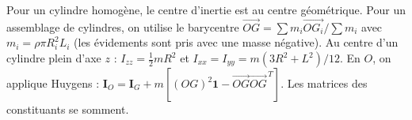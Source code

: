 \begin{corrigebox}
Pour un cylindre homogène, le centre d'inertie est au centre
                géométrique. Pour un assemblage de cylindres, on utilise le barycentre
                $\overrightarrow{OG}=\sum m_i\overrightarrow{OG_i}/\sum m_i$ avec
                $m_i=\rho\pi R_i^2L_i$ (les évidements sont pris avec une masse négative).
Au centre d'un cylindre plein d'axe $z$ :
                $I_{zz}=\tfrac12mR^2$ et
                $I_{xx}=I_{yy}=m(3R^2+L^2)/12$. En $O$, on applique Huygens :
                $\mathbf I_O=\mathbf I_G+m[(OG)^2\mathbf1-\overrightarrow{OG}
                \overrightarrow{OG}^{\,T}]$. Les matrices des constituants se somment.
\end{corrigebox}
